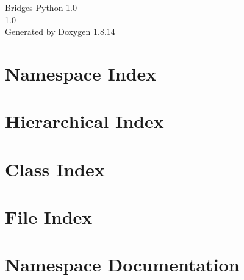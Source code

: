 \documentclass[twoside]{book}
\newcommand{\+}{\discretionary{\mbox{\scriptsize$\hookleftarrow$}}{}{}}
\newcommand{\clearemptydoublepage}{%
  \newpage{\pagestyle{empty}\cleardoublepage}%
}
\begin{document}
\hypersetup{pageanchor=false,
             bookmarksnumbered=true,
             pdfencoding=unicode
            }
\begin{titlepage}
\vspace*{7cm}
\begin{center}%
{\Large Bridges-\/\+Python-\/1.0 \\[1ex]\large 1.\+0 }\\
\vspace*{1cm}
{\large Generated by Doxygen 1.8.14}\\
\end{center}
\end{titlepage}
\clearemptydoublepage
{}
\tableofcontents
\clearemptydoublepage
{}
\hypersetup{pageanchor=true}

\chapter{Namespace Index}

\chapter{Hierarchical Index}

\chapter{Class Index}

\chapter{File Index}

\chapter{Namespace Documentation}
























\end{document}
